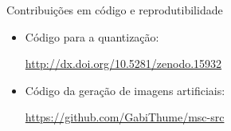 \documentclass{beamer}
\begin{document}
\begin{frame}{Contribuições em código e reprodutibilidade}
  \setlength\leftmargini{1em}
  \justifying
  \begin{itemize}
    \item Código para a quantização:
    \begin{center}
      \small{\url{http://dx.doi.org/10.5281/zenodo.15932}}
    \end{center}
    \item Código da geração de imagens artificiais:
    \begin{center}
      \small{\url{https://github.com/GabiThume/msc-src}}
    \end{center}
  \end{itemize}
\end{frame}
\end{document}
